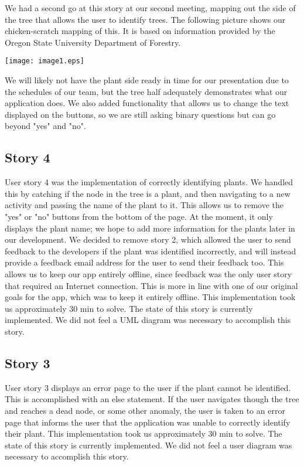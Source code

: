 \documentclass[a4paper]{article}
\begin{document}
We had a second go at this story at our second meeting, mapping out the side of the tree that allows the user to identify trees. The following picture shows our chicken-scratch mapping of this. It is based on information provided by the Oregon State University Department of Forestry\cite{key}. 

\begin{center}\texttt{[image: image1.eps]}\end{center}

We will likely not have the plant side ready in time for our presentation due to the schedules of our team, but the tree half adequately demonstrates what our application does. We also added functionality that allows us to change the text displayed on the buttons, so we are still asking binary questions but can go beyond "yes" and "no".
\pagebreak
\subsection{Story 4}
User story 4 was the implementation of correctly identifying plants.  We handled this by catching if the node in the tree is a plant, and then navigating to a new activity and passing the name of the plant to it. This allows us to remove the "yes" or "no" buttons from the bottom of the page. At the moment, it only displays the plant name; we hope to add more information for the plants later in our development. We decided to remove story 2, which allowed the user to send feedback to the developers if the plant was identified incorrectly, and will instead provide a feedback email address for the user to send their feedback too. This allows us to keep our app entirely offline, since feedback was the only user story that required an Internet connection. This is more in line with one of our original goals for the app, which was to keep it entirely offline. This implementation took us approximately 30 min to solve. The state of this story is currently implemented. We did not feel a UML diagram was necessary to accomplish this story.
\newline
\subsection{Story 3}
User story 3 displays an error page to the user if the plant cannot be identified. This is accomplished with an else statement. If the user navigates though the tree and reaches a dead node, or some other anomaly, the user is taken to an error page that informs the user that the application was unable to correctly identify their plant. This implementation took us approximately 30 min to solve. The state of this story is currently implemented. We did not feel a user diagram was necessary to accomplish this story.
\pagebreak
\end{document}
